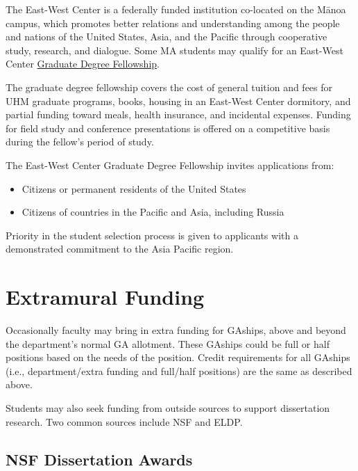 \documentclass[
]{book}
\providecommand{\tightlist}{%
  \setlength{\itemsep}{0pt}\setlength{\parskip}{0pt}}
\begin{document}
The East-West Center is a federally funded institution co-located on the Mānoa campus, which promotes better relations and understanding among the people and nations of the United States, Asia, and the Pacific through cooperative study, research, and dialogue. Some MA students may qualify for an East-West Center
\href{https://www.eastwestcenter.org/education/ewc-graduate-degree-fellowship}{Graduate Degree Fellowship}.

The graduate degree fellowship covers the cost of general tuition and fees for UHM graduate programs, books, housing in an East-West Center dormitory, and partial funding toward meals, health insurance, and incidental expenses. Funding for field study and conference presentations is offered on a competitive basis during the fellow's period of study.

The East-West Center Graduate Degree Fellowship invites applications from:

\begin{itemize}
\tightlist
\item
  Citizens or permanent residents of the United States
\item
  Citizens of countries in the Pacific and Asia, including Russia
\end{itemize}

Priority in the student selection process is given to applicants with a demonstrated commitment to the Asia Pacific region.

\hypertarget{extramural-funding}{%
\section{Extramural Funding}\label{extramural-funding}}

Occasionally faculty may bring in extra funding for GAships, above and beyond the department's normal GA allotment. These GAships could be full or half positions based on the needs of the position. Credit requirements for all GAships (i.e., department/extra funding and full/half positions) are the same as described above.

Students may also seek funding from outside sources to support dissertation research. Two common sources include NSF and ELDP.

\hypertarget{nsf-dissertation-awards}{%
\subsection{NSF Dissertation Awards}\label{nsf-dissertation-awards}}
\end{document}
